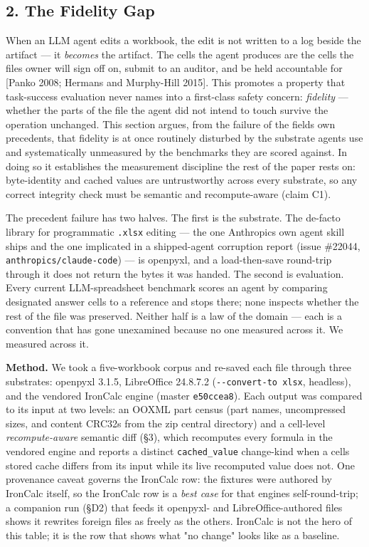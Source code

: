 \documentclass[
]{article}
\newcounter{none} %
\begin{document}
\subsection{2. The Fidelity Gap}\label{2-the-fidelity-gap}

When an LLM agent edits a workbook, the edit is not written to a log
beside the artifact --- it \emph{becomes} the artifact. The cells the
agent produces are the cells the file\textquotesingle s owner will sign
off on, submit to an auditor, and be held accountable for {[}Panko 2008;
Hermans and Murphy-Hill 2015{]}. This promotes a property that
task-success evaluation never names into a first-class safety concern:
\emph{fidelity} --- whether the parts of the file the agent did not
intend to touch survive the operation unchanged. This section argues,
from the failure of the field\textquotesingle s own precedents, that
fidelity is at once routinely disturbed by the substrate agents use and
systematically unmeasured by the benchmarks they are scored against. In
doing so it establishes the measurement discipline the rest of the paper
rests on: byte-identity and cached values are untrustworthy across every
substrate, so any correct integrity check must be semantic and
recompute-aware (claim C1).

The precedent failure has two halves. The first is the substrate. The
de-facto library for programmatic \texttt{.xlsx} editing --- the one
Anthropic\textquotesingle s own agent skill ships and the one implicated
in a shipped-agent corruption report (issue \#22044,
\texttt{anthropics/claude-code}) --- is openpyxl, and a load-then-save
round-trip through it does not return the bytes it was handed. The
second is evaluation. Every current LLM-spreadsheet benchmark scores an
agent by comparing designated answer cells to a reference and stops
there; none inspects whether the rest of the file was preserved. Neither
half is a law of the domain --- each is a convention that has gone
unexamined because no one measured across it. We measured across it.

\textbf{Method.} We took a five-workbook corpus and re-saved each file
through three substrates: openpyxl 3.1.5, LibreOffice 24.8.7.2
(\texttt{-\/-convert-to\ xlsx}, headless), and the vendored IronCalc
engine (master \texttt{e50ccea8}). Each output was compared to its input
at two levels: an OOXML part census (part names, uncompressed sizes, and
content CRC32s from the zip central directory) and a cell-level
\emph{recompute-aware} semantic diff (§3), which recomputes every
formula in the vendored engine and reports a distinct
\texttt{cached\_value} change-kind when a cell\textquotesingle s stored
cache differs from its input while its live recomputed value does not.
One provenance caveat governs the IronCalc row: the fixtures were
authored by IronCalc itself, so the IronCalc row is a \emph{best case}
for that engine\textquotesingle s self-round-trip; a companion run (§D2)
that feeds it openpyxl- and LibreOffice-authored files shows it rewrites
foreign files as freely as the others. IronCalc is not the hero of this
table; it is the row that shows what "no change" looks like as a
baseline.
\end{document}
